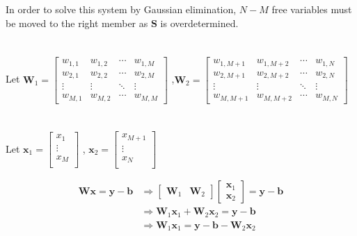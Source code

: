 \documentclass{article}
\begin{document}
    In order to solve this system by Gaussian elimination, $N-M$ free variables must be moved to the right member as $\textbf{S}$ is overdetermined.
    \\\\
    \\
    Let $\textbf{W}_{1} = \begin{bmatrix}
        w_{1,1} & w_{1,2} & \cdots & w_{1,M} \\
        w_{2,1} & w_{2,2} & \cdots & w_{2,M} \\
        \vdots  & \vdots  & \ddots & \vdots  \\
        w_{M,1} & w_{M,2} & \cdots & w_{M,M} 
        \end{bmatrix}$
    ,$\textbf{W}_{2} = \begin{bmatrix}
        w_{1,M+1} & w_{1,M+2} & \cdots & w_{1,N} \\
        w_{2,M+1} & w_{2,M+2} & \cdots & w_{2,N} \\
        \vdots  & \vdots  & \ddots & \vdots  \\
        w_{M,M+1} & w_{M,M+2} & \cdots & w_{M,N} 
        \end{bmatrix}$
    \\\\\\
    Let $\textbf{x}_{1}=\begin{bmatrix}
        x_{1} \\
        \vdots \\
        x_{M} \\
    \end{bmatrix}
    $
    , $\textbf{x}_{2}=\begin{bmatrix}
        x_{M+1} \\
        \vdots \\
        x_{N} \\
    \end{bmatrix}
    $

    \begin{equation*}
        \begin{split}
            \textbf{W}\textbf{x}  =\textbf{y}-\textbf{b} &\Rightarrow 
            \begin{bmatrix}\textbf{W}_{1}&\textbf{W}_{2} \end{bmatrix} \begin{bmatrix}\textbf{x}_{1} \\\textbf{x}_{2} \end{bmatrix} =\textbf{y}-\textbf{b}\\
             & \Rightarrow  \textbf{W}_{1} \textbf{x}_{1} + \textbf{W}_{2} \textbf{x}_{2} = \textbf{y}-\textbf{b} \\
             & \Rightarrow  \textbf{W}_{1} \textbf{x}_{1} = \textbf{y}-\textbf{b}-\textbf{W}_{2} \textbf{x}_{2}
            \end{split}
    \end{equation*} 
\end{document}
